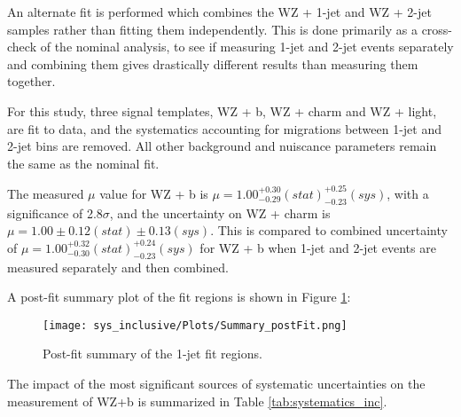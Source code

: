 
An alternate fit is performed which combines the WZ + 1-jet and WZ + 2-jet samples rather than fitting them independently. This is done primarily as a cross-check of the nominal analysis, to see if measuring 1-jet and 2-jet events separately and combining them gives drastically different results than measuring them together. 

For this study, three signal templates, WZ + b, WZ + charm and WZ + light, are fit to data, and the systematics accounting for migrations between 1-jet and 2-jet bins are removed. All other background and nuiscance parameters remain the same as the nominal fit. 

The measured $\mu$ value for WZ + b is  $\mu = 1.00^{+0.30}_{-0.29}(stat)^{+0.25}_{-0.23}(sys)$, with a significance of 2.8$\sigma$, and the uncertainty on WZ + charm is $\mu = 1.00\pm 0.12 (stat)\pm 0.13 (sys)$. This is compared to combined uncertainty of $\mu = 1.00^{+0.32}_{-0.30}(stat)^{+0.24}_{-0.23}(sys)$ for WZ + b when 1-jet and 2-jet events are measured separately and then combined.

A post-fit summary plot of the fit regions is shown in Figure \ref{fig:fit_results_inc}: 

\begin{figure}[H]
    \center
    \texttt{[image: sys\_inclusive/Plots/Summary\_postFit.png]}
    \caption{Post-fit summary of the 1-jet fit regions.}
    \label{fig:fit_results_inc}
\end{figure}

The impact of the most significant sources of systematic uncertainties on the measurement of WZ+b is summarized in Table \ref{tab:systematics_inc}. 

